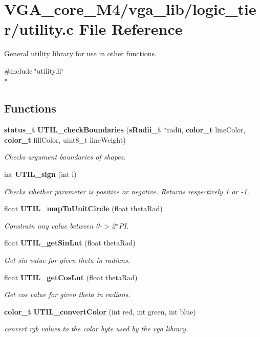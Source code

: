 \section{V\+G\+A\+\_\+core\+\_\+\+M4/vga\+\_\+lib/logic\+\_\+tier/utility.c File Reference}
\label{utility_8c}


General utility library for use in other functions.  


{\ttfamily \#include \char`\"{}utility.\+h\char`\"{}}\\*
\subsection*{Functions}
\begin{DoxyCompactItemize}
\item 
{\bf status\+\_\+t} {\bf U\+T\+I\+L\+\_\+check\+Boundaries} ({\bf s\+Radii\+\_\+t} $\ast$radii, {\bf color\+\_\+t} line\+Color, {\bf color\+\_\+t} fill\+Color, uint8\+\_\+t line\+Weight)
\begin{DoxyCompactList}\small\item\em Checks argument boundaries of shapes. \end{DoxyCompactList}\item 
int {\bf U\+T\+I\+L\+\_\+sign} (int i)
\begin{DoxyCompactList}\small\item\em Checks whether parameter is positive or negative. Returns respectively 1 or -\/1. \end{DoxyCompactList}\item 
float {\bf U\+T\+I\+L\+\_\+map\+To\+Unit\+Circle} (float theta\+Rad)
\begin{DoxyCompactList}\small\item\em Constrain any value between 0-\/$>$2$\ast$\+PI. \end{DoxyCompactList}\item 
float {\bf U\+T\+I\+L\+\_\+get\+Sin\+Lut} (float theta\+Rad)
\begin{DoxyCompactList}\small\item\em Get sin value for given theta in radians. \end{DoxyCompactList}\item 
float {\bf U\+T\+I\+L\+\_\+get\+Cos\+Lut} (float theta\+Rad)
\begin{DoxyCompactList}\small\item\em Get cos value for given theta in radians. \end{DoxyCompactList}\item 
{\bf color\+\_\+t} {\bf U\+T\+I\+L\+\_\+convert\+Color} (int red, int green, int blue)
\begin{DoxyCompactList}\small\item\em convert rgb values to the color byte used by the vga library. \end{DoxyCompactList}\end{DoxyCompactItemize}


